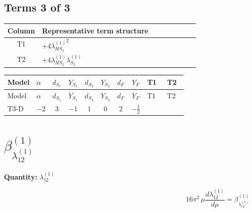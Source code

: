 \documentclass[8pt]{article}
\begin{document}
\begin{landscape}
\subsection*{Terms 3 of 3}
\begin{center}
\begin{tabular}{@{}c >{\raggedright\arraybackslash}p{0.82\linewidth}@{}}
\toprule
Column & Representative term structure \\
\midrule
T1 & \(\displaystyle +4 {\lambda_{HS_2}^{(1)}}^2\) \\
\midrule
T2 & \(\displaystyle +4 {\lambda_{HS_2}^{(1)}} {\lambda_{S_2}^{(1)}}\) \\
\midrule
\bottomrule
\end{tabular}
\end{center}
\smallskip
\tiny
\begin{longtable}{@{}llcccccc >{\raggedright\arraybackslash}p{0.21\linewidth} >{\raggedright\arraybackslash}p{0.21\linewidth}@{}}
\toprule
Model & $\alpha$ & $d_{S_1}$ & $Y_{S_1}$ & $d_{S_2}$ & $Y_{S_2}$ & $d_F$ & $Y_F$ & T1 & T2 \\
\midrule
\endfirsthead
\toprule
Model & $\alpha$ & $d_{S_1}$ & $Y_{S_1}$ & $d_{S_2}$ & $Y_{S_2}$ & $d_F$ & $Y_F$ & T1 & T2 \\
\midrule
\endhead
T3-D & $-2$ & $3$ & $-1$ & $1$ & $0$ & $2$ & $-\frac{1}{2}$ & \scriptsize\adjustbox{max width=\linewidth}{$\begin{gathered} +4 {\lambda_{HS_2}^{(1)}}^2\end{gathered}$} & \scriptsize\adjustbox{max width=\linewidth}{$\begin{gathered} +4 {\lambda_{HS_2}^{(1)}} {\lambda_{S_2}^{(1)}}\end{gathered}$} \\
\midrule
\bottomrule
\end{longtable}
\clearpage
\section*{$\beta_{\lambda_{12}^{(1)}}^{(1)}$}
\noindent\textbf{Quantity: }$\lambda_{12}^{(1)}$\par\smallskip
\[16\pi^2\,\mu\frac{d \lambda_{12}^{(1)}}{d\mu}=\beta_{\lambda_{12}^{(1)}}^{(1)}\]

\end{landscape}
\end{document}
